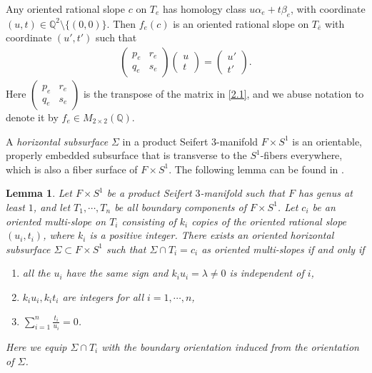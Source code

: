 \documentclass{amsart}
\numberwithin{equation}{section}
\newtheorem{lemma}[theorem]{Lemma}
\theoremstyle{definition}
\begin{document}
Any oriented rational slope $c$ on $T_e$ has homology class $u\alpha_e+t\beta_e$, with coordinate $(u,t)\in \mathbb{Q}^2\setminus \{(0,0)\}$.
Then $f_e(c)$ is an oriented rational slope on $T_{\bar{e}}$ with coordinate $(u',t')$ such that
\begin{align}\label{2.2}
\begin{pmatrix}
p_e & r_e \\
q_e & s_e
\end{pmatrix}
\begin{pmatrix}
u\\
t
\end{pmatrix}=
\begin{pmatrix}
u'\\
t'
\end{pmatrix}.
\end{align}
Here $\begin{pmatrix}
p_e & r_e \\
q_e & s_e
\end{pmatrix}$ is the transpose of the matrix in \eqref{2.1}, and we abuse notation to denote it by $f_e\in M_{2\times 2}(\mathbb{Q})$.


A {\it horizontal subsurface} $\Sigma$ in a product Seifert $3$-manifold $F\times S^1$ is an orientable, properly embedded subsurface that is transverse to the $S^1$-fibers everywhere, which is also a fiber surface of $F\times S^1$. The following lemma can be found in \cite[Lemma 1.1]{WY}.
 
\begin{lemma}\label{horizontalsurface}
Let $F\times S^1$ be a product Seifert $3$-manifold such that $F$ has genus at least $1$, and let $T_1,\cdots, T_n$ be all boundary components of $F\times S^1$. Let $c_i$ be an oriented multi-slope on $T_i$ consisting of $k_i$ copies of the oriented rational slope  $(u_i,t_i)$, where $k_i$ is a positive integer. There exists an oriented horizontal subsurface $\Sigma \subset F\times S^1$  such that $\Sigma\cap T_i=c_i$ as oriented multi-slopes if and only if
\begin{enumerate} 
\item all the $u_i$ have the same sign and $k_iu_i=\lambda\ne 0$ is independent of $i$,
\item $k_iu_i,k_it_i$ are integers for all $i=1,\cdots,n$,
\item $\sum_{i=1}^n\frac{t_i}{u_i}=0$.
\end{enumerate}
Here we equip $\Sigma\cap T_i$ with the boundary orientation induced from the orientation of $\Sigma$.
\end{lemma}
\end{document}
